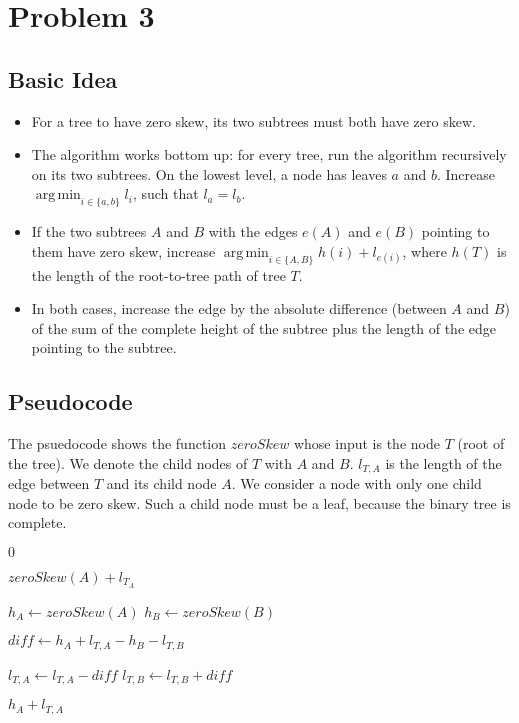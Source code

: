 \documentclass[12pt]{article}
\DeclareMathOperator*{\argmin}{arg\,min}
\begin{document}
\section*{Problem 3}
\subsection*{Basic Idea}
\begin{itemize}
	\item For a tree to have zero skew, its two subtrees must both have zero skew.
	\item The algorithm works bottom up: for every tree, run the algorithm recursively on its two subtrees. On the lowest level, a node has leaves $a$ and $b$. Increase $\argmin_{i \in \{a,b\}} l_i$, such that $l_a = l_b$.
	\item If the two subtrees $A$ and $B$ with the edges $e(A)$ and $e(B)$ pointing to them have zero skew, increase $\argmin_{i \in \{A, B\}} h(i) + l_{e(i)}$, where $h(T)$ is the length of the root-to-tree path of tree $T$.
	\item In both cases, increase the edge by the absolute difference (between $A$ and $B$) of the sum of the complete height of the subtree plus the length of the edge pointing to the subtree.
\end{itemize}

\subsection*{Pseudocode}
The psuedocode shows the function $\mathit{zeroSkew}$ whose input is the node $T$ (root of the tree). We denote the child nodes of $T$ with $A$ and $B$. $l_{T, A}$ is the length of the edge between $T$ and its child node $A$. We consider a node with only one child node to be zero skew. Such a child node must be a leaf, because the binary tree is complete.

\begin{algorithmic}

		\Return $0$
		
		\Return $\mathit{zeroSkew}(A) + l_{T_A}$
	\EndIf

	\State $h_A \gets \mathit{zeroSkew}(A)$
	\State $h_B \gets \mathit{zeroSkew}(B)$

	\State $\mathit{diff} \gets h_A + l_{T, A} - h_B - l_{T, B}$

		\State $l_{T, A} \gets l_{T, A} - \mathit{diff}$
		\State $l_{T, B} \gets l_{T, B} + \mathit{diff}$
	\EndIf

	\Return $h_A + l_{T, A}$
\end{algorithmic}
\end{document}
